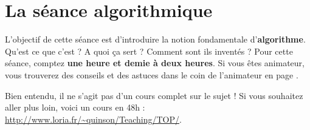 \documentclass[a5paper,pagesize,DIV=14]{scrbook}
\begin{document}

\section*{La séance algorithmique}

L'objectif de cette séance est d'introduire la notion fondamentale d'\textbf{al\-gorithme}. Qu'est ce que c'est ? A quoi ça sert ? Comment sont ils inventés ? Pour cette séance, comptez \textbf{une heure et demie à deux heures}. Si vous êtes animateur, vous trouverez des conseils et des astuces dans le coin de l'animateur en page \pageref{chap:coin-animateur}.

Bien entendu, il ne s'agit pas d'un cours complet sur le sujet ! Si vous souhaitez aller plus loin, voici un cours en 48h : \url{http://www.loria.fr/~quinson/Teaching/TOP/}.
\end{document}
